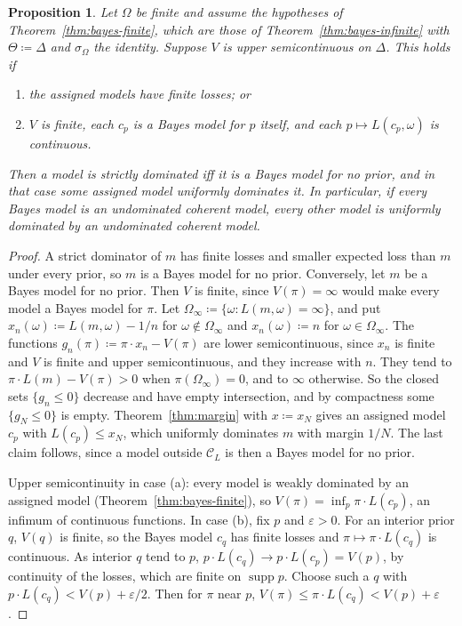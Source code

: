\documentclass[11pt]{article}
\newtheorem{proposition}[theorem]{Proposition}
\theoremstyle{definition}
\theoremstyle{remark}
\newcommand{\C}{\mathcal C}
\newcommand{\supp}{\operatorname{supp}}
\begin{document}
\begin{proposition}\label{prop:strict}
Let $\Omega$ be finite and assume the hypotheses of Theorem~\ref{thm:bayes-finite}, which are those of Theorem~\ref{thm:bayes-infinite} with $\Theta\coloneqq\Delta$ and $\sigma_\Omega$ the identity. Suppose $V$ is upper semicontinuous on $\Delta$. This holds if
\begin{enumerate}[label=(\alph*)]
\item the assigned models have finite losses; or
\item $V$ is finite, each $c_p$ is a Bayes model for $p$ itself, and each $p\mapsto L(c_p,\omega)$ is continuous.
\end{enumerate}
Then a model is strictly dominated iff it is a Bayes model for no prior, and in that case some assigned model uniformly dominates it. In particular, if every Bayes model is an undominated coherent model, every other model is uniformly dominated by an undominated coherent model.
\end{proposition}
\begin{proof}
A strict dominator of $m$ has finite losses and smaller expected loss than $m$ under every prior, so $m$ is a Bayes model for no prior. Conversely, let $m$ be a Bayes model for no prior. Then $V$ is finite, since $V(\pi)=\infty$ would make every model a Bayes model for $\pi$. Let $\Omega_\infty\coloneqq\{\omega:L(m,\omega)=\infty\}$, and put $x_n(\omega)\coloneqq L(m,\omega)-1/n$ for $\omega\notin\Omega_\infty$ and $x_n(\omega)\coloneqq n$ for $\omega\in\Omega_\infty$. The functions $g_n(\pi)\coloneqq\pi\cdot x_n-V(\pi)$ are lower semicontinuous, since $x_n$ is finite and $V$ is finite and upper semicontinuous, and they increase with $n$. They tend to $\pi\cdot L(m)-V(\pi)>0$ when $\pi(\Omega_\infty)=0$, and to $\infty$ otherwise. So the closed sets $\{g_n\le0\}$ decrease and have empty intersection, and by compactness some $\{g_N\le0\}$ is empty. Theorem~\ref{thm:margin} with $x\coloneqq x_N$ gives an assigned model $c_p$ with $L(c_p)\le x_N$, which uniformly dominates $m$ with margin $1/N$. The last claim follows, since a model outside $\C_L$ is then a Bayes model for no prior.

Upper semicontinuity in case (a): every model is weakly dominated by an assigned model (Theorem~\ref{thm:bayes-finite}), so $V(\pi)=\inf_p\pi\cdot L(c_p)$, an infimum of continuous functions. In case (b), fix $p$ and $\varepsilon>0$. For an interior prior $q$, $V(q)$ is finite, so the Bayes model $c_q$ has finite losses and $\pi\mapsto\pi\cdot L(c_q)$ is continuous. As interior $q$ tend to $p$, $p\cdot L(c_q)\to p\cdot L(c_p)=V(p)$, by continuity of the losses, which are finite on $\supp p$. Choose such a $q$ with $p\cdot L(c_q)<V(p)+\varepsilon/2$. Then for $\pi$ near $p$, $V(\pi)\le\pi\cdot L(c_q)<V(p)+\varepsilon$.
\end{proof}
\end{document}
